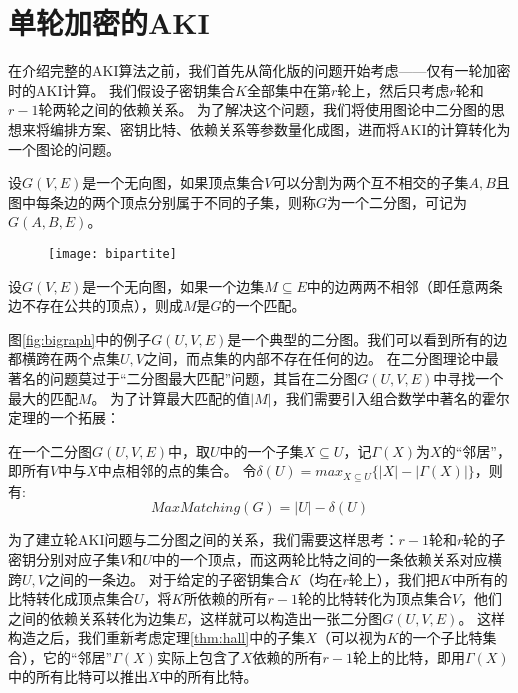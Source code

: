 \section{单轮加密的AKI}
在介绍完整的AKI算法之前，我们首先从简化版的问题开始考虑——仅有一轮加密时的AKI计算。
我们假设子密钥集合$K$全部集中在第$r$轮上，然后只考虑$r$轮和$r-1$轮两轮之间的依赖关系。
为了解决这个问题，我们将使用图论中二分图的思想来将编排方案、密钥比特、依赖关系等参数量化成图，进而将AKI的计算转化为一个图论的问题。
\begin{defn}[二分图]
    设$G(V,E)$是一个无向图，如果顶点集合$V$可以分割为两个互不相交的子集$A,B$且图中每条边的两个顶点分别属于不同的子集，则称$G$为一个二分图，可记为$G(A,B,E)$。
\end{defn}
\begin{figure}
    \centering
    \texttt{[image: bipartite]}
\end{figure}
\begin{defn}[图的匹配]
    设$G(V,E)$是一个无向图，如果一个边集$M\subseteq E$中的边两两不相邻（即任意两条边不存在公共的顶点），则成$M$是$G$的一个匹配。
\end{defn}
图\ref{fig:bigraph}中的例子$G(U,V,E)$是一个典型的二分图。我们可以看到所有的边都横跨在两个点集$U,V$之间，而点集的内部不存在任何的边。
在二分图理论中最著名的问题莫过于“二分图最大匹配”问题，其旨在二分图$G(U,V,E)$中寻找一个最大的匹配$M$。
为了计算最大匹配的值$|M|$，我们需要引入组合数学中著名的霍尔定理的一个拓展：
\begin{thm}
    在一个二分图$G(U,V,E)$中，取$U$中的一个子集$X\subseteq U$，记$\Gamma(X)$为$X$的“邻居”，即所有$V$中与$X$中点相邻的点的集合。
    令$\delta(U)=max_{X\subseteq U}\{|X|-|\Gamma(X)|\}$，则有:
    $$MaxMatching(G)=|U|-\delta(U)$$
    \label{thm:hall}
\end{thm}
为了建立轮AKI问题与二分图之间的关系，我们需要这样思考：$r-1$轮和$r$轮的子密钥分别对应子集$V$和$U$中的一个顶点，而这两轮比特之间的一条依赖关系对应横跨$U,V$之间的一条边。
对于给定的子密钥集合$K$（均在$r$轮上），我们把$K$中所有的比特转化成顶点集合$U$，将$K$所依赖的所有$r-1$轮的比特转化为顶点集合$V$，他们之间的依赖关系转化为边集$E$，这样就可以构造出一张二分图$G(U,V,E)$。
这样构造之后，我们重新考虑定理\ref{thm:hall}中的子集$X$（可以视为$K$的一个子比特集合），它的“邻居”$\Gamma(X)$实际上包含了$X$依赖的所有$r-1$轮上的比特，即用$\Gamma(X)$中的所有比特可以推出$X$中的所有比特。
